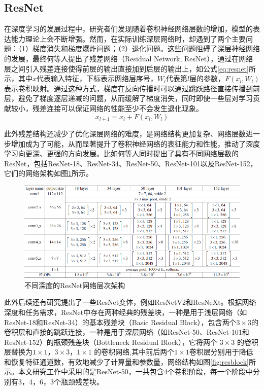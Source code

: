 \documentclass[lang=chs, degree=master, blindreview=false, adobe=false]{yanputhesis}
\begin{document}
\subsection{ResNet}
在深度学习的发展过程中，研究者们发现随着卷积神经网络层数的增加，模型的表达能力理论上会不断增强。然而，在实际训练深层网络时，却遇到了两个主要问题：（1）梯度消失和梯度爆炸问题；（2）退化问题。这些问题阻碍了深层神经网络的发展，最终何等人\cite{He2015ResNet}提出了残差网络（Residual Network, ResNet），通过在网络层之间引入残差连接使得前层的输出直接加到后层的输出上，如公式\ref{eq:resnet}所示，其中$x$代表输入特征，下标表示网络层序号，$W_l$代表第$l$层的参数，$F\left(x_l,W_l\right)$表示卷积映射。通过这种方式，梯度在反向传播时可以通过跳跃路径直接传播到前层，避免了梯度逐层递减的问题，从而缓解了梯度消失，同时即使一些层对学习贡献较小，残差连接可以保证网络的性能至少不会发生退化现象。
\begin{equation}
  \label{eq:resnet}
  x_{l+1} = x_l + F\left(x_l,W_l\right)
\end{equation}

此外残差结构还减少了优化深层网络的难度，是网络结构更加复杂、网络层数进一步增加成为了可能，从而显著提升了卷积神经网络的表征能力和性能，推动了深度学习向更深、更强的方向发展。比如何等人同时提出了具有不同网络层数的ResNet，包括ResNet-18、ResNet-34、ResNet-50、ResNet-101以及ResNet-152，它们的网络架构如图\ref{fig:resnet}所示。
\begin{figure}[htb]
  \centering
  \includegraphics[scale=0.55]{images/resnet.png}
  \caption{
    不同深度的ResNet网络层次架构\cite{He2015ResNet}
  }
  \label{fig:resnet}
\end{figure}
此外后续还有研究提出了一些ResNet变体，例如ResNetV2\cite{2019resnetV2}和ResNeXt\cite{xie2017ResNeXt}。根据网络深度和任务需求，ResNet中存在两种经典的残差块，一种是用于浅层网络（如ResNet-18和ResNet-34）的基本残差块（Basic Residual Block），包含两个$ 3\times3 $的卷积层和直接的跳跃连接，一种是用于深层网络（如ResNet-50、ResNet-101和ResNet-152）的瓶颈残差块（Bottleneck Residual Block），它将两个 $ 3\times3 $ 的卷积层替换为$1 \times 1$，$3 \times 3$，$1 \times 1$ 的卷积网络,其中前后两个$1 \times 1$卷积层分别用于降低和恢复特征通道数，有效地减少了计算量和参数量，网络结构如图\ref{fig:resblock}所示。本文研究工作中采用的是ResNet-50，一共包含4个卷积阶段，每一个阶段中分别有3，4，6，3个瓶颈残差块。
\end{document}

